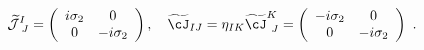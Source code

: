 \begin{equation}
\widetilde{{\cal J}}^I_{~J}=
\left(
\begin{array}{cc}
i\sigma_2 & 0 \\
0         & -i\sigma_2
\end{array}
\right),\quad
\widetilde{\cJ}_{IJ}=\eta_{IK}\widetilde{\cJ}^K_{~J}=
\left(
\begin{array}{cc}
-i\sigma_2 & 0 \\
0         & -i\sigma_2
\end{array}
\right) \ .
\end{equation}

